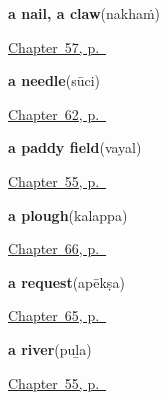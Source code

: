 \noindent\begin{minipage}[t]{\linewidth}
\raggedright
\textbf{a nail, a claw}\enspace\emph{}\enspace(nakhaṁ)\par
\footnotesize \hyperref[ch:ml-five-more-of-the-body]{Chapter~57, p.~\pageref*{ch:ml-five-more-of-the-body}}
\end{minipage}\par\smallskip

\noindent\begin{minipage}[t]{\linewidth}
\raggedright
\textbf{a needle}\enspace\emph{}\enspace(sūci)\par
\footnotesize \hyperref[ch:ml-made-by-hand]{Chapter~62, p.~\pageref*{ch:ml-made-by-hand}}
\end{minipage}\par\smallskip

\noindent\begin{minipage}[t]{\linewidth}
\raggedright
\textbf{a paddy field}\enspace\emph{}\enspace(vayal)\par
\footnotesize \hyperref[ch:ml-ground-underfoot]{Chapter~55, p.~\pageref*{ch:ml-ground-underfoot}}
\end{minipage}\par\smallskip

\noindent\begin{minipage}[t]{\linewidth}
\raggedright
\textbf{a plough}\enspace\emph{}\enspace(kalappa)\par
\footnotesize \hyperref[ch:ml-out-in-the-paddy]{Chapter~66, p.~\pageref*{ch:ml-out-in-the-paddy}}
\end{minipage}\par\smallskip

\noindent\begin{minipage}[t]{\linewidth}
\raggedright
\textbf{a request}\enspace\emph{}\enspace(apēkṣa)\par
\footnotesize \hyperref[ch:ml-asking-well]{Chapter~65, p.~\pageref*{ch:ml-asking-well}}
\end{minipage}\par\smallskip

\noindent\begin{minipage}[t]{\linewidth}
\raggedright
\textbf{a river}\enspace\emph{}\enspace(puḻa)\par
\footnotesize \hyperref[ch:ml-ground-underfoot]{Chapter~55, p.~\pageref*{ch:ml-ground-underfoot}}
\end{minipage}\par\smallskip

